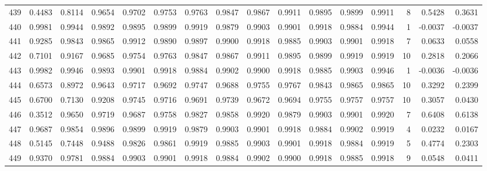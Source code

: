 \begin{tabular}{lrrrrrrrrrrrrrrr}
439 &      0.4483 &  0.8114 &  0.9654 &  0.9702 &  0.9753 &  0.9763 &  0.9847 &  0.9867 &  0.9911 &  0.9895 &   0.9899 &     0.9911 &      8 &                    0.5428 &                     0.3631 \\
440 &      0.9981 &  0.9944 &  0.9892 &  0.9895 &  0.9899 &  0.9919 &  0.9879 &  0.9903 &  0.9901 &  0.9918 &   0.9884 &     0.9944 &      1 &                   -0.0037 &                    -0.0037 \\
441 &      0.9285 &  0.9843 &  0.9865 &  0.9912 &  0.9890 &  0.9897 &  0.9900 &  0.9918 &  0.9885 &  0.9903 &   0.9901 &     0.9918 &      7 &                    0.0633 &                     0.0558 \\
442 &      0.7101 &  0.9167 &  0.9685 &  0.9754 &  0.9763 &  0.9847 &  0.9867 &  0.9911 &  0.9895 &  0.9899 &   0.9919 &     0.9919 &     10 &                    0.2818 &                     0.2066 \\
443 &      0.9982 &  0.9946 &  0.9893 &  0.9901 &  0.9918 &  0.9884 &  0.9902 &  0.9900 &  0.9918 &  0.9885 &   0.9903 &     0.9946 &      1 &                   -0.0036 &                    -0.0036 \\
444 &      0.6573 &  0.8972 &  0.9643 &  0.9717 &  0.9692 &  0.9747 &  0.9688 &  0.9755 &  0.9767 &  0.9843 &   0.9865 &     0.9865 &     10 &                    0.3292 &                     0.2399 \\
445 &      0.6700 &  0.7130 &  0.9208 &  0.9745 &  0.9716 &  0.9691 &  0.9739 &  0.9672 &  0.9694 &  0.9755 &   0.9757 &     0.9757 &     10 &                    0.3057 &                     0.0430 \\
446 &      0.3512 &  0.9650 &  0.9719 &  0.9687 &  0.9758 &  0.9827 &  0.9858 &  0.9920 &  0.9879 &  0.9903 &   0.9901 &     0.9920 &      7 &                    0.6408 &                     0.6138 \\
447 &      0.9687 &  0.9854 &  0.9896 &  0.9899 &  0.9919 &  0.9879 &  0.9903 &  0.9901 &  0.9918 &  0.9884 &   0.9902 &     0.9919 &      4 &                    0.0232 &                     0.0167 \\
448 &      0.5145 &  0.7448 &  0.9488 &  0.9826 &  0.9861 &  0.9919 &  0.9885 &  0.9903 &  0.9901 &  0.9918 &   0.9884 &     0.9919 &      5 &                    0.4774 &                     0.2303 \\
449 &      0.9370 &  0.9781 &  0.9884 &  0.9903 &  0.9901 &  0.9918 &  0.9884 &  0.9902 &  0.9900 &  0.9918 &   0.9885 &     0.9918 &      9 &                    0.0548 &                     0.0411 \\

\end{tabular}
